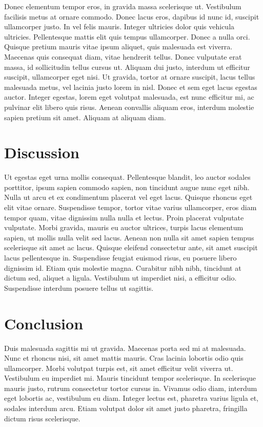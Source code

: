\documentclass[a4paper, 11pt]{article}
\begin{document}
\begin{multicols}{2}
Donec elementum tempor eros, in gravida massa scelerisque ut. Vestibulum facilisis metus at ornare commodo. Donec lacus eros, dapibus id nunc id, suscipit ullamcorper justo. In vel felis mauris. Integer ultricies dolor quis vehicula ultricies. Pellentesque mattis elit quis tempus ullamcorper. Donec a nulla orci. Quisque pretium mauris vitae ipsum aliquet, quis malesuada est viverra. Maecenas quis consequat diam, vitae hendrerit tellus. Donec vulputate erat massa, id sollicitudin tellus cursus ut. Aliquam dui justo, interdum ut efficitur suscipit, ullamcorper eget nisi. Ut gravida, tortor at ornare suscipit, lacus tellus malesuada metus, vel lacinia justo lorem in nisl. Donec et sem eget lacus egestas auctor. Integer egestas, lorem eget volutpat malesuada, est nunc efficitur mi, ac pulvinar elit libero quis risus. Aenean convallis aliquam eros, interdum molestie sapien pretium sit amet. Aliquam at aliquam diam.



\section{Discussion}
Ut egestas eget urna mollis consequat. Pellentesque blandit, leo auctor sodales porttitor, ipsum sapien commodo sapien, non tincidunt augue nunc eget nibh. Nulla ut arcu et ex condimentum placerat vel eget lacus. Quisque rhoncus eget elit vitae ornare. Suspendisse tempor, tortor vitae varius ullamcorper, eros diam tempor quam, vitae dignissim nulla nulla et lectus. Proin placerat vulputate vulputate. Morbi gravida, mauris eu auctor ultrices, turpis lacus elementum sapien, ut mollis nulla velit sed lacus. Aenean non nulla sit amet sapien tempus scelerisque sit amet ac lacus. Quisque eleifend consectetur ante, sit amet suscipit lacus pellentesque in. Suspendisse feugiat euismod risus, eu posuere libero dignissim id. Etiam quis molestie magna. Curabitur nibh nibh, tincidunt at dictum sed, aliquet a ligula. Vestibulum ut imperdiet nisi, a efficitur odio. Suspendisse interdum posuere tellus ut sagittis.

\section{Conclusion}
Duis malesuada sagittis mi ut gravida. Maecenas porta sed mi at malesuada. Nunc et rhoncus nisi, sit amet mattis mauris. Cras lacinia lobortis odio quis ullamcorper. Morbi volutpat turpis est, sit amet efficitur velit viverra ut. Vestibulum eu imperdiet mi. Mauris tincidunt tempor scelerisque. In scelerisque mauris justo, rutrum consectetur tortor cursus in. Vivamus odio diam, interdum eget lobortis ac, vestibulum eu diam. Integer lectus est, pharetra varius ligula et, sodales interdum arcu. Etiam volutpat dolor sit amet justo pharetra, fringilla dictum risus scelerisque.
\end{multicols}
\end{document}
